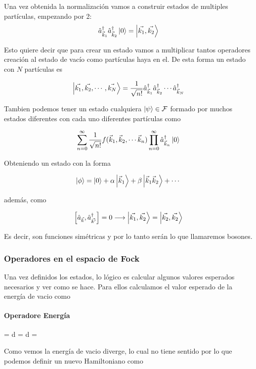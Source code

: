 Una vez obtenida la normalización vamos a construir estados de multiples partículas, empezando por 2:
\[\hat{a}^{\dagger}_{\vec{k}_{1}}\hat{a}^{\dagger}_{\vec{k}_{2}}\ket{0}=\ket{\vec{k_{1}}, \vec{k_{2}}}\]

Esto quiere decir que para crear un estado vamos a multiplicar tantos operadores creación al estado de vacío como partículas haya en el. De esta forma un estado con $N$ partículas es 

\[\ket{\vec{k_{1}}, \vec{k_{2}}, \cdots, \vec{k_{N}}}=\frac{1}{\sqrt{n!}} \hat{a}^{\dagger}_{\vec{k}_{1}}\hat{a}^{\dagger}_{\vec{k}_{2}}\cdots \hat{a}^{\dagger}_{\vec{k}_{N}}\]

Tambien podemos tener un estado cualquiera $\ket{\psi}\in \mathcal{F}$ formado por muchos estados diferentes con cada uno diferentes partículas como 

\[\sum_{n=0}^{\infty}\frac{1}{\sqrt{n!}} f(\vec{k}_{1}, \vec{k}_{2},\cdots \vec{k}_{n}) \prod_{n=0}^{\infty}\hat{a}^{\dagger}_{\vec{k}_{n}} \ket{0}\]

Obteniendo un estado con la forma 

\[\ket{\phi}= \ket{0}+ \alpha\ket{\vec{k}_{1}}+\beta\ket{\vec{k}_{1} \vec{k}_{2}} + \cdots\]

además, como 

\[\comm{\hat{a}_{\vec{k}}}{\hat{a}^{\dagger}_{\vec{k'}}}=0 \longrightarrow \ket{\vec{k_{1}}, \vec{k_{2}}}=\ket{\vec{k_{2}}, \vec{k_{2}}}\]

Es decir, son funciones simétricas y por lo tanto serán lo que llamaremos bosones.

\subsubsection{Operadores en el espacio de Fock}
Una vez definidos los estados, lo lógico es calcular algunos valores esperados necesarios y ver como se hace. Para ellos calculamos el valor esperado de la energía de vacio como 
\paragraph{Operadore Energía}
\begin{DispWithArrows}[format=c, displaystyle]
= \int d  = \int d = \infty
\end{DispWithArrows}

Como vemos la energía de vacio diverge, lo cual no tiene sentido por lo que podemos definir un nuevo Hamiltoniano como 

